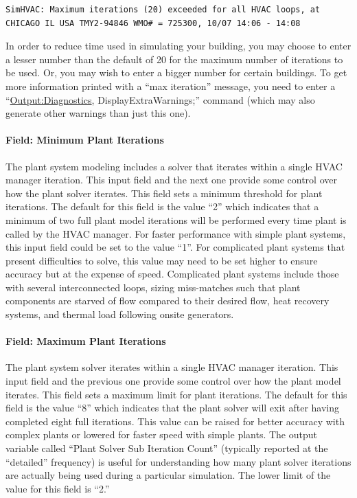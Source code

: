 \begin{lstlisting}
SimHVAC: Maximum iterations (20) exceeded for all HVAC loops, at CHICAGO IL USA TMY2-94846 WMO# = 725300, 10/07 14:06 - 14:08
\end{lstlisting}

In order to reduce time used in simulating your building, you may choose to enter a lesser number than the default of 20 for the maximum number of iterations to be used. Or, you may wish to enter a bigger number for certain buildings. To get more information printed with a ``max iteration'' message, you need to enter a ``\hyperref[outputdiagnostics]{Output:Diagnostics}, DisplayExtraWarnings;'' command (which may also generate other warnings than just this one).

\paragraph{Field: Minimum Plant Iterations}\label{field-minimum-plant-iterations}

The plant system modeling includes a solver that iterates within a single HVAC manager iteration. This input field and the next one provide some control over how the plant solver iterates. This field sets a minimum threshold for plant iterations. The default for this field is the value ``2'' which indicates that a minimum of two full plant model iterations will be performed every time plant is called by the HVAC manager. For faster performance with simple plant systems, this input field could be set to the value ``1''. For complicated plant systems that present difficulties to solve, this value may need to be set higher to ensure accuracy but at the expense of speed. Complicated plant systems include those with several interconnected loops, sizing miss-matches such that plant components are starved of flow compared to their desired flow, heat recovery systems, and thermal load following onsite generators.

\paragraph{Field: Maximum Plant Iterations}\label{field-maximum-plant-iterations}

The plant system solver iterates within a single HVAC manager iteration. This input field and the previous one provide some control over how the plant model iterates. This field sets a maximum limit for plant iterations. The default for this field is the value ``8'' which indicates that the plant solver will exit after having completed eight full iterations. This value can be raised for better accuracy with complex plants or lowered for faster speed with simple plants. The output variable called ``Plant Solver Sub Iteration Count'' (typically reported at the ``detailed'' frequency) is useful for understanding how many plant solver iterations are actually being used during a particular simulation. The lower limit of the value for this field is ``2.''

